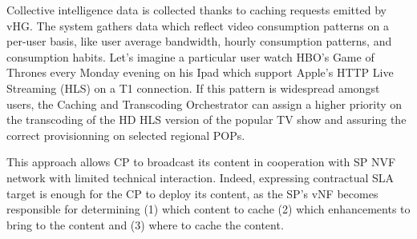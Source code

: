 Collective intelligence data is collected thanks to caching requests emitted by vHG.
The system gathers data which reflect video consumption patterns on a per-user basis, like user average bandwidth, hourly consumption patterns, and consumption habits.
Let's imagine a particular user watch HBO's Game of Thrones every Monday evening on his Ipad which support Apple's HTTP Live Streaming (HLS) on a T1 connection.
If this pattern is widespread amongst users, the Caching and Transcoding Orchestrator can assign a higher priority on the transcoding of the HD HLS version of the popular TV show and assuring the correct provisionning on selected regional POPs.

This approach allows CP to broadcast its content in cooperation with SP NVF network with limited technical interaction.
Indeed, expressing contractual SLA target is enough for the CP to deploy its content, as the SP's vNF becomes responsible for determining (1) which content to cache (2) which enhancements to bring to the content and (3) where to cache the content.
